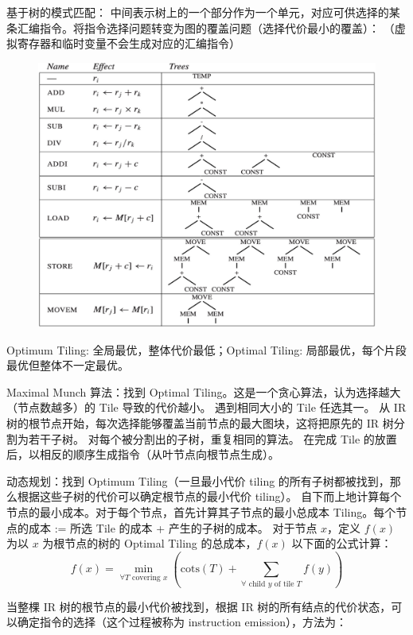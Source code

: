 \par \noindent 基于树的模式匹配：
中间表示树上的一个部分作为一个单元，对应可供选择的某条汇编指令。将指令选择问题转变为图的覆盖问题（选择代价最小的覆盖）：
（虚拟寄存器和临时变量不会生成对应的汇编指令）

\begin{figure}[H]
    \centering
    \includegraphics[width=\linewidth]{figures/is1.png}
\end{figure}

\par \noindent Optimum Tiling: 全局最优，整体代价最低；Optimal Tiling: 局部最优，每个片段最优但整体不一定最优。

\par \noindent Maximal Munch 算法：找到 Optimal Tiling。这是一个贪心算法，认为选择越大（节点数越多）的 Tile 导致的代价越小。
遇到相同大小的 Tile 任选其一。
从 IR 树的根节点开始，每次选择能够覆盖当前节点的最大图块，这将把原先的 IR 树分割为若干子树。
对每个被分割出的子树，重复相同的算法。
在完成 Tile 的放置后，以相反的顺序生成指令（从叶节点向根节点生成）。

\par \noindent 动态规划：找到 Optimum Tiling（一旦最小代价 tiling 的所有子树都被找到，那么根据这些子树的代价可以确定根节点的最小代价 tiling）。
自下而上地计算每个节点的最小成本。对于每个节点，首先计算其子节点的最小总成本 Tiling。每个节点的成本 := 所选 Tile 的成本 + 产生的子树的成本。
对于节点 $x$，定义 $f(x)$ 为以 $x$ 为根节点的树的 Optimal Tiling 的总成本，$f(x)$ 以下面的公式计算： 
\vspace{-10pt}
$$
f(x) = \min_{\forall T\text{ covering }x}\left( \text{cots}(T) + \sum_{\forall \text{ child }y\text{ of tile }T}f(y) \right)
$$
\vspace{-15pt}
\par \noindent 当整棵 IR 树的根节点的最小代价被找到，根据 IR 树的所有结点的代价状态，可以确定指令的选择（这个过程被称为 instruction emission），方法为：

